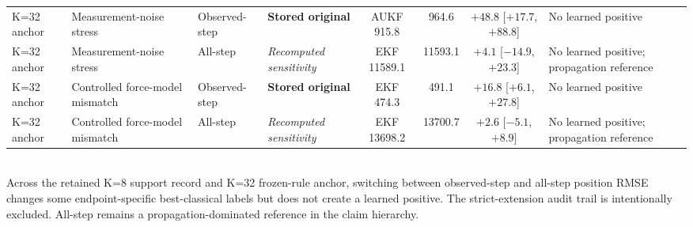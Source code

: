 \begin{table}[t]
{\begin{tabular}{llllcccl}
    K=32 anchor & Measurement-noise stress & Observed-step & \textbf{Stored original} & AUKF 915.8 & 964.6 & $+48.8$ [$+17.7$, $+88.8$] & No learned positive \\
    K=32 anchor & Measurement-noise stress & All-step & \emph{Recomputed sensitivity} & EKF 11589.1 & 11593.1 & $+4.1$ [$-14.9$, $+23.3$] & No learned positive; propagation reference \\
    K=32 anchor & Controlled force-model mismatch & Observed-step & \textbf{Stored original} & EKF 474.3 & 491.1 & $+16.8$ [$+6.1$, $+27.8$] & No learned positive \\
    K=32 anchor & Controlled force-model mismatch & All-step & \emph{Recomputed sensitivity} & EKF 13698.2 & 13700.7 & $+2.6$ [$-5.1$, $+8.9$] & No learned positive; propagation reference \\
    \bottomrule
  \end{tabular}
  }
  \\[2pt]{\footnotesize Across the retained K=8 support record and K=32 frozen-rule anchor, switching between observed-step and all-step position RMSE changes some endpoint-specific best-classical labels but does not create a learned positive. The strict-extension audit trail is intentionally excluded. All-step remains a propagation-dominated reference in the claim hierarchy.}
\end{table}